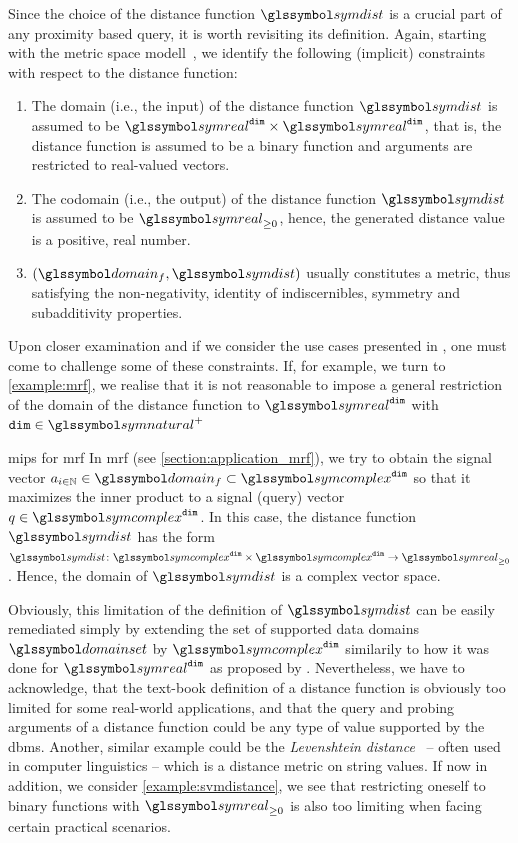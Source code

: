 Since the choice of the distance function $\symdist$ is a crucial part of any proximity based query, it is worth revisiting its definition. Again, starting with the metric space modell~\cite{Zezula:2006Similarity}, we identify the following (implicit) constraints with respect to the distance function:

\begin{enumerate}
    \item The domain (i.e., the input) of the distance function $\symdist$ is assumed to be $\symreal^{\mathtt{dim}} \times \symreal^{\mathtt{dim}}$, that is, the distance function is assumed to be a binary function and arguments are restricted to real-valued vectors.
    \item The codomain (i.e., the output) of the distance function $\symdist$ is assumed to be $\symreal_{\geq 0}$, hence, the generated distance value is a positive, real number.
    \item $(\domain_f,\symdist)$ usually constitutes a metric, thus satisfying the non-negativity, identity of indiscernibles, symmetry and subadditivity properties.
\end{enumerate}

Upon closer examination and if we consider the use cases presented in , one must come to challenge some of these constraints. If, for example, we turn to \cref{example:mrf}, we realise that it is not reasonable to impose a general restriction of the domain of the distance function to $\symreal^{\mathtt{dim}}$ with $\mathtt{dim} \in \symnatural^{+}$

\begin{example}[label=example:mrf]{\acrlong{mips}{} for \acrshort{mrf}}{}
    In \acrshort{mrf} (see \cref{section:application_mrf}), we try to obtain the signal vector $a_{i \in \mathbb{N}} \in \domain_f \subset \symcomplex^{\mathtt{dim}}$ so that it maximizes the inner product to a signal (query) vector $q \in \symcomplex^{\mathtt{dim}}$. In this case, the distance function $\symdist$ has the form $\symdist \colon \symcomplex^{\mathtt{dim}} \times \symcomplex^{\mathtt{dim}} \to \symreal_{\geq 0}$. Hence, the domain of $\symdist$ is a complex vector space.
\end{example}

Obviously, this limitation of the definition of $\symdist$ can be easily remediated simply by extending the set of supported data domains $\domainset$ by $\symcomplex^{\mathtt{dim}}$ similarily to how it was done for $\symreal^{\mathtt{dim}}$ as proposed by \cite{Giangreco:2018Database}. Nevertheless, we have to acknowledge, that the text-book definition of a distance function is obviously too limited for some real-world applications, and that the query and probing arguments of a distance function could be any type of value supported by the \acrshort{dbms}. Another, similar example could be the \emph{Levenshtein distance}~\cite{Levensthtein:1965Binary} -- often used in computer linguistics -- which is a distance metric on string values. If now in addition, we consider \cref{example:svmdistance}, we see that restricting oneself to binary functions with $\symreal_{\geq 0}$ is also too limiting when facing certain practical scenarios.

